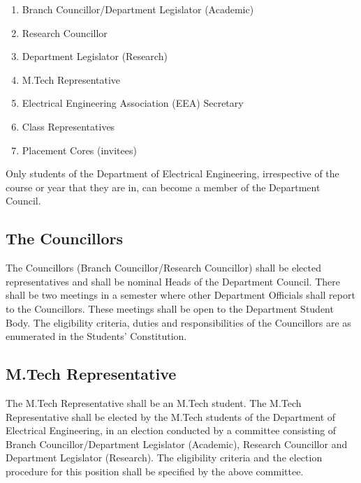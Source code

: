 \documentclass[12pt]{charter}
\begin{document}
\begin{enumerate}
	\item Branch Councillor/Department Legislator (Academic)
	\item Research Councillor
	\item Department Legislator (Research)
	\item M.Tech Representative
	\item Electrical Engineering Association (EEA) Secretary
	\item Class Representatives
	\item Placement Cores (invitees)
	
\end{enumerate}

Only students of the Department of Electrical Engineering, irrespective of the course or year that they are in, can become a member of the Department Council.

\subsection{The Councillors}

The Councillors (Branch Councillor/Research Councillor) shall be elected representatives and shall be nominal Heads of the Department Council. There shall be two meetings in a semester where other Department Officials shall report to the Councillors. These meetings shall be open to the Department Student Body. The eligibility criteria, duties and responsibilities of the Councillors are as enumerated in the Students’ Constitution.

\subsection{M.Tech Representative}

The M.Tech Representative shall be an M.Tech student. The M.Tech Representative shall be elected by the M.Tech students of the Department of Electrical Engineering, in an election conducted by a committee consisting of Branch Councillor/Department Legislator (Academic), Research Councillor and Department Legislator (Research). The eligibility criteria and the election procedure for this position shall be specified by the above committee.
\end{document}
